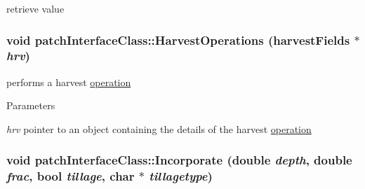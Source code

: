 retrieve value \hypertarget{classpatch_interface_class_ae1a9d662c855a6ffd6988c5274af35f0}{
\subsubsection[{HarvestOperations}]{\setlength{\rightskip}{0pt plus 5cm}void patchInterfaceClass::HarvestOperations ({\bf harvestFields} $\ast$ {\em hrv})}}
\label{classpatch_interface_class_ae1a9d662c855a6ffd6988c5274af35f0}


performs a harvest \hyperlink{classoperation}{operation} 
\begin{DoxyParams}{Parameters}
\item[{\em hrv}]pointer to an object containing the details of the harvest \hyperlink{classoperation}{operation} \end{DoxyParams}
\hypertarget{classpatch_interface_class_a631b4c8068483aa35e1e84012b1d5a99}{
\subsubsection[{Incorporate}]{\setlength{\rightskip}{0pt plus 5cm}void patchInterfaceClass::Incorporate (double {\em depth}, \/  double {\em frac}, \/  bool {\em tillage}, \/  char $\ast$ {\em tillagetype})}}
\label{classpatch_interface_class_a631b4c8068483aa35e1e84012b1d5a99}


